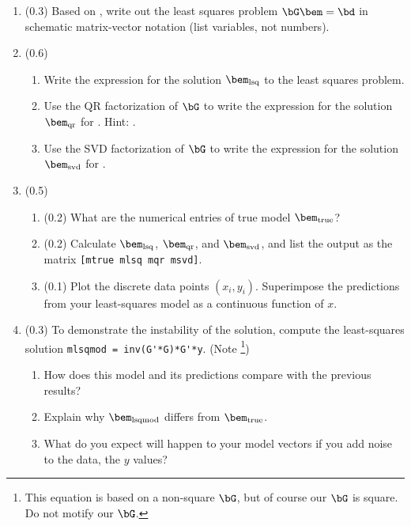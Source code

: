 \documentclass[11pt,titlepage,fleqn]{article}
\begin{document}
\begin{enumerate}
\item (0.3) Based on , write out the least squares problem $\bG\bem = \bd$ in schematic matrix-vector notation (list variables, not numbers).


\item (0.6) 

\begin{enumerate}
\item Write the expression for the solution $\bem_{\rm lsq}$ to the least squares problem.
\item Use the QR factorization of $\bG$ to write the expression for the solution $\bem_{\rm qr}$ for \makebox{$\bG\bem = \bd$}. Hint: \citet[][Appendix A]{Aster}.

\item Use the SVD factorization of $\bG$ to write the expression for the solution $\bem_{\rm svd}$ for \makebox{$\bG\bem = \bd$}.
\end{enumerate}

\item (0.5)

\begin{enumerate}
\item (0.2) What are the numerical entries of true model $\bem_{\rm true}$?
\item (0.2) Calculate $\bem_{\rm lsq}$, $\bem_{\rm qr}$, and $\bem_{\rm svd}$, and list the output as the matrix \verb+[mtrue mlsq mqr msvd]+.
\item (0.1) Plot the discrete data points $(x_i,y_i)$. Superimpose the predictions from your least-squares model as a continuous function of $x$.
\end{enumerate}


\item (0.3) To demonstrate the instability of the solution, compute the least-squares solution \verb+mlsqmod = inv(G'*G)*G'*y+. (Note \footnote{This equation is based on a non-square $\bG$, but of course our $\bG$ is square. Do not motify our $\bG$.})
%
\begin{enumerate}
\item How does this model and its predictions compare with the previous results?
\item Explain why $\bem_{\rm lsqmod}$ differs from $\bem_{\rm true}$.
\item What do you expect will happen to your model vectors if you add noise to the data, \ie the $y$ values?
\end{enumerate}

\end{enumerate}
\end{document}

